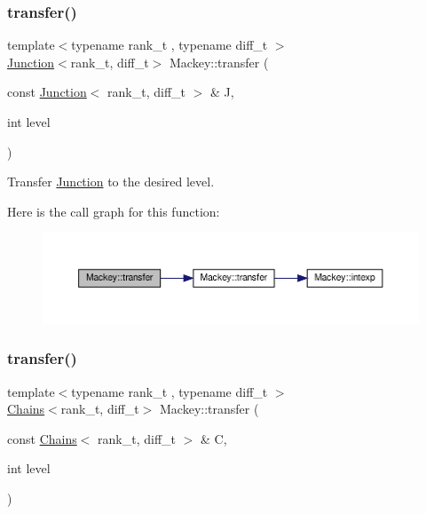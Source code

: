 \subsubsection{\texorpdfstring{transfer()}{transfer()}\hspace{0.1cm}{\footnotesize\ttfamily [3/6]}}
{\footnotesize\ttfamily template$<$typename rank\+\_\+t , typename diff\+\_\+t $>$ \\
\hyperlink{classMackey_1_1Junction}{Junction}$<$rank\+\_\+t, diff\+\_\+t$>$ Mackey\+::transfer (\begin{DoxyParamCaption}\item[{const \hyperlink{classMackey_1_1Junction}{Junction}$<$ rank\+\_\+t, diff\+\_\+t $>$ \&}]{J,  }\item[{int}]{level }\end{DoxyParamCaption})}



Transfer \hyperlink{classMackey_1_1Junction}{Junction} to the desired level. 

Here is the call graph for this function\+:\nopagebreak
\begin{figure}[H]
\begin{center}
\leavevmode
\includegraphics[width=350pt]{namespaceMackey_a914aba7f868e67ae3fd9da3995678660_cgraph}
\end{center}
\end{figure}
\mbox{\label{namespaceMackey_a50837580391b5c6705e23c637d742b22}} 
\subsubsection{\texorpdfstring{transfer()}{transfer()}\hspace{0.1cm}{\footnotesize\ttfamily [4/6]}}
{\footnotesize\ttfamily template$<$typename rank\+\_\+t , typename diff\+\_\+t $>$ \\
\hyperlink{classMackey_1_1Chains}{Chains}$<$rank\+\_\+t, diff\+\_\+t$>$ Mackey\+::transfer (\begin{DoxyParamCaption}\item[{const \hyperlink{classMackey_1_1Chains}{Chains}$<$ rank\+\_\+t, diff\+\_\+t $>$ \&}]{C,  }\item[{int}]{level }\end{DoxyParamCaption})}



